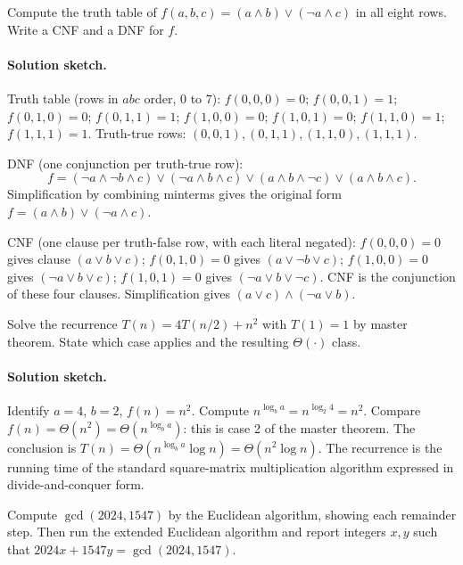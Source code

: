 \begin{exercise}
Compute the truth table of $f(a, b, c) = (a \land b) \lor (\lnot
a \land c)$ in all eight rows. Write a CNF and a DNF for $f$.
\end{exercise}

\paragraph{Solution sketch.}
Truth table (rows in $abc$ order, $0$ to $7$): $f(0,0,0) = 0$;
$f(0,0,1) = 1$; $f(0,1,0) = 0$; $f(0,1,1) = 1$; $f(1,0,0) = 0$;
$f(1,0,1) = 0$; $f(1,1,0) = 1$; $f(1,1,1) = 1$. Truth-true rows:
$(0,0,1), (0,1,1), (1,1,0), (1,1,1)$.

DNF (one conjunction per truth-true row):
\[
f = (\lnot a \land \lnot b \land c) \lor (\lnot a \land b \land c)
  \lor (a \land b \land \lnot c) \lor (a \land b \land c).
\]
Simplification by combining minterms gives the original form
$f = (a \land b) \lor (\lnot a \land c)$.

CNF (one clause per truth-false row, with each literal negated):
$f(0,0,0) = 0$ gives clause $(a \lor b \lor c)$;
$f(0,1,0) = 0$ gives $(a \lor \lnot b \lor c)$;
$f(1,0,0) = 0$ gives $(\lnot a \lor b \lor c)$;
$f(1,0,1) = 0$ gives $(\lnot a \lor b \lor \lnot c)$. CNF is the
conjunction of these four clauses. Simplification gives
$(a \lor c) \land (\lnot a \lor b)$.

\begin{exercise}
Solve the recurrence $T(n) = 4 T(n/2) + n^{2}$ with $T(1) = 1$ by
master theorem. State which case applies and the resulting
$\Theta(\cdot)$ class.
\end{exercise}

\paragraph{Solution sketch.}
Identify $a = 4$, $b = 2$, $f(n) = n^{2}$. Compute
$n^{\log_{b} a} = n^{\log_{2} 4} = n^{2}$. Compare $f(n) =
\Theta(n^{2}) = \Theta(n^{\log_{b} a})$: this is case 2 of the
master theorem. The conclusion is $T(n) = \Theta(n^{\log_{b} a}
\log n) = \Theta(n^{2} \log n)$. The recurrence is the running
time of the standard square-matrix multiplication algorithm
expressed in divide-and-conquer form.

\begin{exercise}
Compute $\gcd(2024, 1547)$ by the Euclidean algorithm, showing each
remainder step. Then run the extended Euclidean algorithm and
report integers $x, y$ such that $2024 x + 1547 y = \gcd(2024,
1547)$.
\end{exercise}

